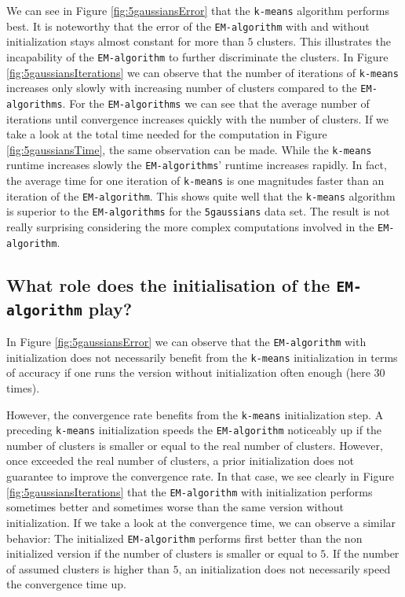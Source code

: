 \documentclass[a4paper, 12pt, titlepage]{article}
\begin{document}
We can see in Figure \ref{fig:5gaussiansError} that the \texttt{k-means} algorithm performs best.
It is noteworthy that the error of the \texttt{EM-algorithm} with and without initialization stays almost constant for more than $5$ clusters.
This illustrates the incapability of the \texttt{EM-algorithm} to further discriminate the clusters.
In Figure \ref{fig:5gaussiansIterations} we can observe that the number of iterations of \texttt{k-means} increases only slowly with increasing number of clusters compared to the \texttt{EM-algorithms}.
For the \texttt{EM-algorithms} we can see that the average number of iterations until convergence increases quickly with the number of clusters.
If we take a look at the total time needed for the computation in Figure \ref{fig:5gaussiansTime}, the same observation can be made.
While the \texttt{k-means} runtime increases slowly the \texttt{EM-algorithms}' runtime increases rapidly.
In fact, the average time for one iteration of \texttt{k-means} is one magnitudes faster than an iteration of the \texttt{EM-algorithm}.
This shows quite well that the \texttt{k-means} algorithm is superior to the \texttt{EM-algorithms} for the \texttt{5gaussians} data set.
The result is not really surprising considering the more complex computations involved in the \texttt{EM-algorithm}.

\subsection{What role does the initialisation of the \texttt{EM-algorithm} play?}

In Figure \ref{fig:5gaussiansError} we can observe that the \texttt{EM-algorithm} with initialization does not necessarily benefit from the \texttt{k-means} initialization in terms of accuracy if one runs the version without initialization often enough (here $30$ times).

However, the convergence rate benefits from the \texttt{k-means} initialization step.
A preceding \texttt{k-means} initialization speeds the \texttt{EM-algorithm} noticeably up if the number of clusters is smaller or equal to the real number of clusters.
However, once exceeded the real number of clusters, a prior initialization does not guarantee to improve the convergence rate.
In that case, we see clearly in Figure \ref{fig:5gaussiansIterations} that the \texttt{EM-algorithm} with initialization performs sometimes better and sometimes worse than the same version without initialization.
If we take a look at the convergence time, we can observe a similar behavior: The initialized \texttt{EM-algorithm} performs first better than the non initialized version if the number of clusters is smaller or equal to $5$.
If the number of assumed clusters is higher than $5$, an initialization does not necessarily speed the convergence time up.
\end{document}
